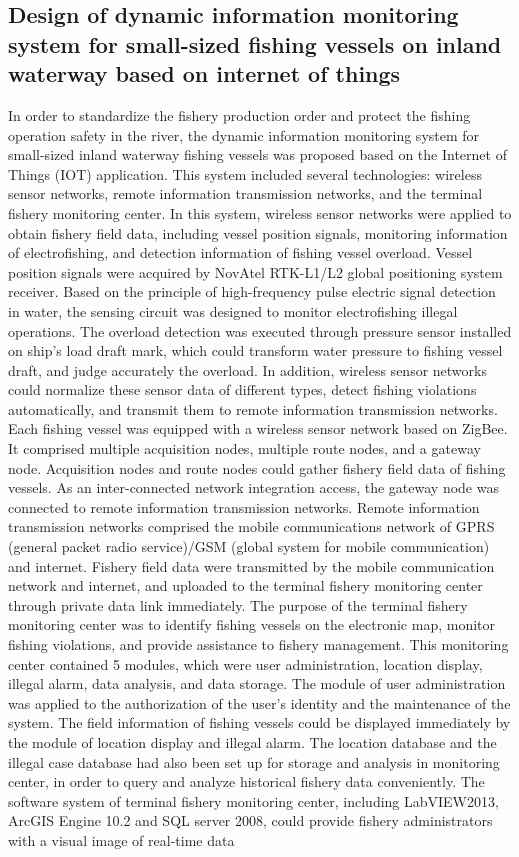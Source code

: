 \documentclass[12pt]{article}
\begin{document}
		\subsection*{Design of dynamic information monitoring system for small-sized fishing vessels on inland waterway based on internet of things}
		In order to standardize the fishery production order and protect the fishing operation safety in the river, the dynamic information monitoring system for small-sized inland waterway fishing vessels was proposed based on the Internet of Things (IOT) application. This system included several technologies: wireless sensor networks, remote information transmission networks, and the terminal fishery monitoring center. In this system, wireless sensor networks were applied to obtain fishery field data, including vessel position signals, monitoring information of electrofishing, and detection information of fishing vessel overload. Vessel position signals were acquired by NovAtel RTK-L1/L2 global positioning system receiver. Based on the principle of high-frequency pulse electric signal detection in water, the sensing circuit was designed to monitor electrofishing illegal operations. The overload detection was executed through pressure sensor installed on ship's load draft mark, which could transform water pressure to fishing vessel draft, and judge accurately the overload. In addition, wireless sensor networks could normalize these sensor data of different types, detect fishing violations automatically, and transmit them to remote information transmission networks. Each fishing vessel was equipped with a wireless sensor network based on ZigBee. It comprised multiple acquisition nodes, multiple route nodes, and a gateway node. Acquisition nodes and route nodes could gather fishery field data of fishing vessels. As an inter-connected network integration access, the gateway node was connected to remote information transmission networks. Remote information transmission networks comprised the mobile communications network of GPRS (general packet radio service)/GSM (global system for mobile communication) and internet. Fishery field data were transmitted by the mobile communication network and internet, and uploaded to the terminal fishery monitoring center through private data link immediately. The purpose of the terminal fishery monitoring center was to identify fishing vessels on the electronic map, monitor fishing violations, and provide assistance to fishery management. This monitoring center contained 5 modules, which were user administration, location display, illegal alarm, data analysis, and data storage. The module of user administration was applied to the authorization of the user's identity and the maintenance of the system. The field information of fishing vessels could be displayed immediately by the module of location display and illegal alarm. The location database and the illegal case database had also been set up for storage and analysis in monitoring center, in order to query and analyze historical fishery data conveniently. The software system of terminal fishery monitoring center, including LabVIEW2013, ArcGIS Engine 10.2 and SQL server 2008, could provide fishery administrators with a visual image of real-time data 
\end{document}
